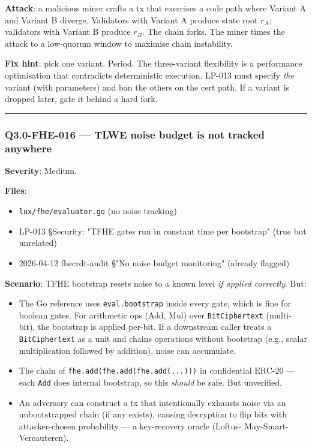 \documentclass[
]{article}
\providecommand{\tightlist}{%
  \setlength{\itemsep}{0pt}\setlength{\parskip}{0pt}}
\begin{document}
\textbf{Attack}: a malicious miner crafts a tx that exercises a code
path where Variant A and Variant B diverge. Validators with Variant A
produce state root \(r_A\); validators with Variant B produce \(r_B\).
The chain forks. The miner times the attack to a low-quorum window to
maximise chain instability.

\textbf{Fix hint}: pick one variant. Period. The three-variant
flexibility is a performance optimisation that contradicts deterministic
execution. LP-013 must specify \emph{the} variant (with parameters) and
ban the others on the cert path. If a variant is dropped later, gate it
behind a hard fork.

\begin{center}\rule{0.5\linewidth}{0.5pt}\end{center}

\subsubsection{Q3.0-FHE-016 --- TLWE noise budget is not tracked
anywhere}\label{q30-fhe-016--tlwe-noise-budget-is-not-tracked-anywhere}

\textbf{Severity}: Medium.

\textbf{Files}:

\begin{itemize}
\tightlist
\item
  \texttt{lux/fhe/evaluator.go} (no noise tracking)
\item
  LP-013 §Security: "TFHE gates run in constant time per bootstrap"
  (true but unrelated)
\item
  2026-04-12 fhecrdt-audit §"No noise budget monitoring" (already
  flagged)
\end{itemize}

\textbf{Scenario}: TFHE bootstrap resets noise to a known level \emph{if
applied correctly}. But:

\begin{itemize}
\tightlist
\item
  The Go reference uses \texttt{eval.bootstrap} inside every gate, which
  is fine for boolean gates. For arithmetic ops (Add, Mul) over
  \texttt{BitCiphertext} (multi-bit), the bootstrap is applied per-bit.
  If a downstream caller treats a \texttt{BitCiphertext} as a unit and
  chains operations without bootstrap (e.g., scalar multiplication
  followed by addition), noise can accumulate.
\item
  The chain of \texttt{fhe.add(fhe.add(fhe.add(...)))} in confidential
  ERC-20 --- each \texttt{Add} does internal bootstrap, so this
  \emph{should} be safe. But unverified.
\item
  An adversary can construct a tx that intentionally exhausts noise via
  an unbootstrapped chain (if any exists), causing decryption to flip
  bits with attacker-chosen probability --- a key-recovery oracle
  (Loftus- May-Smart-Vercauteren).
\end{itemize}
\end{document}
